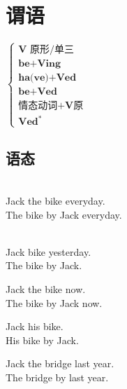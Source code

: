 \section{谓语}
$\left\{
\begin{array}{l}
\textbf{V 原形/单三}\\
\textbf{be+Ving}\\
\textbf{ha(ve)+Ved}\\
\textbf{be+Ved}\\
\textbf{情态动词+V原}\\
\textbf{Ved}^*
\end{array}
\right.$
\subsection{语态}
\begin{subexample} \ \\
		Jack  the bike everyday.\\
		The bike   by Jack everyday.
\end{subexample}
\begin{subexample}\ \\
	Jack  bike yesterday.\\
	The bike   by Jack.
\end{subexample}
\begin{subexample}
	Jack  the bike now.\\
	The bike   by Jack now.
\end{subexample}
\begin{subexample}
	Jack  his bike.\\
	His bike   by Jack.
\end{subexample}
\begin{subexample}
	Jack  the bridge last year.\\
	The bridge   by last year.
\end{subexample}
